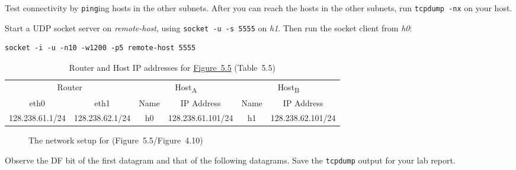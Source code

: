 \documentclass{../UTNetLab}
\begin{document}
    Test connectivity by \lstinline{ping}ing hosts in the other subnets. After you can reach the
    hosts in the other subnets, run \lstinline{tcpdump -nx} on your host.

    Start a UDP socket server on \textit{remote-host}, using \lstinline{socket -u -s 5555} on \textit{h1}.
    Then run the socket client from \textit{h0}:
    \begin{lstlisting}[emph={remote-host}]
socket -i -u -n10 -w1200 -p5 remote-host 5555
    \end{lstlisting}

    \begin{table}[H]
        \caption{Router and Host IP addresses for \hyperref[fig:5.5]{Figure~5.5} (Table~5.5)}
        \centering
        \begin{tabular}{ *2c|*2c|*2c }
            \hline \hline
            \multicolumn{2}{c|}{Router} & \multicolumn{2}{c|}{Host\textsubscript{A}} & \multicolumn{2}{c}{Host\textsubscript{B}} \\
            eth0 & eth1 & Name & IP Address & Name & IP Address \\
            \hline 
            128.238.61.1/24 & 128.238.62.1/24 & h0 & 128.238.61.101/24 & h1 & 128.238.62.101/24 \\
            \hline \hline
            \end{tabular}
    \end{table}

    \begin{figure}[H]
        \centering
        \caption{The network setup for  (Figure~5.5/Figure~4.10)}
        \label{fig:5.5}
    \end{figure}

    Observe the DF bit of the first datagram and that of the following datagrams. Save the \lstinline{tcpdump} output for your lab report.
\end{document}
